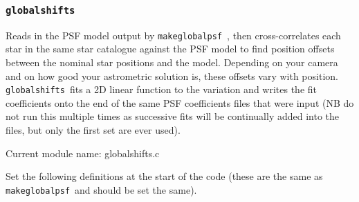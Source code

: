\documentclass{article}
\def\globalshifts{{\tt globalshifts}\ }
\def\makeglobalpsf{{\tt makeglobalpsf}\ }
\begin{document}
\subsubsection{\globalshifts}
Reads in the PSF model output by \makeglobalpsf, then cross-correlates each star in the same star catalogue
against the PSF model to find position offsets between the nominal star positions and the model. 
Depending on your camera and on how good your astrometric solution is, these offsets vary with position.
\globalshifts fits a 2D linear function to the variation and writes the fit coefficients onto the end
of the same PSF coefficients files that were input (NB do not run this multiple times as successive
fits will be continually added into the files, but only the first set are ever used).

Current module name: globalshifts.c

Set the following definitions at the start of the code (these are the same as \makeglobalpsf and should be
set the same).
\end{document}
